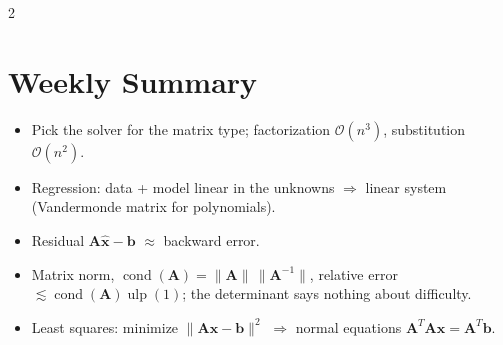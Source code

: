 \documentclass[a4paper,9pt]{extarticle}
\begin{document}
\begin{multicols}{2}
\section{Weekly Summary}


\begin{summary}

\begin{itemize}

\item Pick the solver for the matrix type; factorization $\mathcal{O}(n^3)$, substitution
$\mathcal{O}(n^2)$.

\item Regression: data + model linear in the unknowns $\Rightarrow$ linear system (Vandermonde
matrix for polynomials).

\item Residual $\mathbf{A}\hat{\mathbf{x}} - \mathbf{b}$ $\approx$ backward error.

\item Matrix norm, $\operatorname{cond}(\mathbf{A}) = \|\mathbf{A}\|\,\|\mathbf{A}^{-1}\|$,
relative error $\lesssim \operatorname{cond}(\mathbf{A})\operatorname{ulp}(1)$; the determinant
says nothing about difficulty.

\item Least squares: minimize $\|\mathbf{A}\mathbf{x} - \mathbf{b}\|^2$ $\Rightarrow$ normal
equations $\mathbf{A}^T\mathbf{A}\mathbf{x} = \mathbf{A}^T\mathbf{b}$.

\end{itemize}

\end{summary}



\end{multicols}
\end{document}
